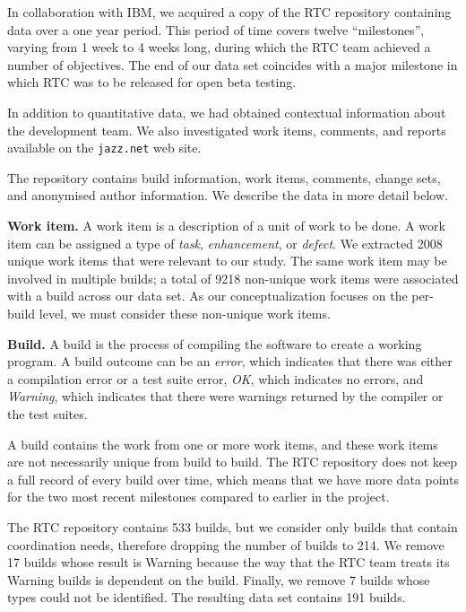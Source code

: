 In collaboration with IBM, we acquired a copy of the RTC repository containing data over a one year period.
This period of time covers twelve ``milestones'', varying from 1 week to 4 weeks long, during which the RTC team achieved a number of objectives. The end of our data set coincides with a major milestone in which RTC was to be released for open beta testing. 

In addition to quantitative data, we had obtained contextual information about the development team. We also investigated work items, comments, and reports available on the \texttt{jazz.net} web site.

The repository contains build information, work items, comments, change sets, and anonymised author information. We describe the data in more detail below.

\textbf{Work item.} A work item is a description of a unit of work to be done. A work item can be assigned a type of \emph{task}, \emph{enhancement}, or \emph{defect}.
We extracted 2008 unique work items that were relevant to our study.
The same work item may be involved in multiple builds; a total of 9218 non-unique work items were associated with a build across our data set. As our conceptualization focuses on the per-build level, we must consider these non-unique work items.

\textbf{Build.} A build is the process of compiling the software to create a working program.
A build outcome can be an \emph{error}, which indicates that there was either a
compilation error or a test suite error, \emph{OK}, which indicates no
errors, and \emph{Warning}, which indicates that there were warnings
returned by the compiler or the test suites.

A build contains the work from one or more work items, and these work items are not necessarily unique from build to build. The RTC repository does not keep a full record of every build over time, which means that we have more data points for the two most recent milestones compared to earlier in the project.

The RTC repository contains 533 builds, but we consider only builds that contain coordination needs, therefore dropping the number of builds to 214.  We remove 17 builds whose result is Warning because the way that the RTC team treats its Warning builds is dependent on the build. Finally, we remove 7 builds whose types could not be identified. The resulting data set contains 191 builds.

